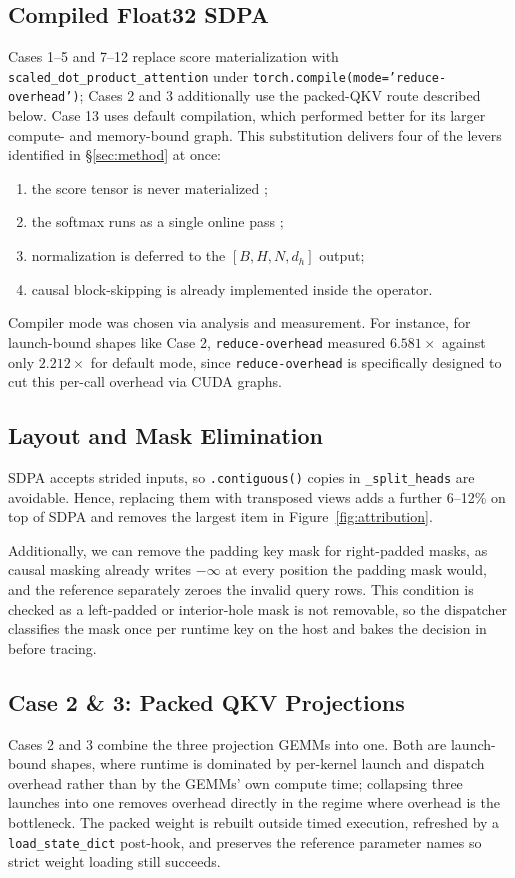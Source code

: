 \documentclass[10pt,conference,compsoc]{IEEEtran}
\begin{document}
\subsection{Compiled Float32 SDPA}
Cases 1--5 and 7--12 replace score materialization with \texttt{scaled\_dot\_product\_attention} under \texttt{torch.compile(mode=\allowbreak'reduce-overhead')}; Cases 2 and 3 additionally use the packed-QKV route described below. Case 13 uses default compilation, which performed better for its larger compute- and memory-bound graph. This substitution delivers four of the levers identified in \S\ref{sec:method} at once:
\begin{enumerate}
    \item the score tensor is never materialized \cite{rabe,flash2};
    \item the softmax runs as a single online pass \cite{online};
    \item normalization is deferred to the $[B,H,N,d_h]$ output;
    \item causal block-skipping is already implemented inside the operator.
\end{enumerate}

Compiler mode was chosen via analysis and measurement. For instance, for launch-bound shapes like Case 2, \texttt{reduce-overhead} measured $6.581\times$ against only $2.212\times$ for default mode, since \texttt{reduce-overhead} is specifically designed to cut this per-call overhead via CUDA graphs.

\subsection{Layout and Mask Elimination}
SDPA accepts strided inputs, so \texttt{.contiguous()} copies in \texttt{\_split\_heads} are avoidable. Hence, replacing them with transposed views adds a further 6--12\% on top of SDPA and removes the largest item in Figure~\ref{fig:attribution}.

Additionally, we can remove the padding key mask for right-padded masks, as causal masking already writes $-\infty$ at every position the padding mask would, and the reference separately zeroes the invalid query rows. This condition is checked as a left-padded or interior-hole mask is not removable, so the dispatcher classifies the mask once per runtime key on the host and bakes the decision in before tracing.

\subsection{Case 2 \& 3: Packed QKV Projections}
Cases 2 and 3 combine the three projection GEMMs into one. Both are launch-bound shapes, where runtime is dominated by per-kernel launch and dispatch overhead rather than by the GEMMs' own compute time; collapsing three launches into one removes overhead directly in the regime where overhead is the bottleneck. The packed weight is rebuilt outside timed execution, refreshed by a \texttt{load\_state\_dict} post-hook, and preserves the reference parameter names so strict weight loading still succeeds.
\end{document}
